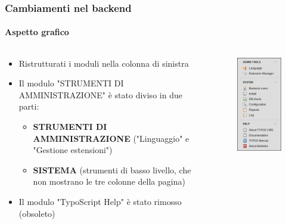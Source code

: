 
\begin{frame}[fragile]
	\frametitle{Cambiamenti nel backend}
	\framesubtitle{Aspetto grafico}

	\begin{columns}[T]

		\begin{column}{.6\textwidth}

			\begin{itemize}
				\item Ristrutturati i moduli nella colonna di sinistra
				\item Il modulo "STRUMENTI DI AMMINISTRAZIONE" è stato diviso in due parti:

					\begin{itemize}
						\item \textbf{STRUMENTI DI AMMINISTRAZIONE} ("Linguaggio" e "Gestione estensioni")
						\item \textbf{SISTEMA} (strumenti di basso livello, che non mostrano le tre colonne della pagina)
					\end{itemize}

				\item Il modulo "TypoScript Help" è stato rimosso (obsoleto)

			\end{itemize}

		\end{column}

		\begin{column}{.4\textwidth}
			\begin{figure}\vspace*{-0.4cm}
				\includegraphics[width=0.35\linewidth]{Images/BackendChanges/AdminTools.png}
			\end{figure}
		\end{column}

	\end{columns}

\end{frame}

